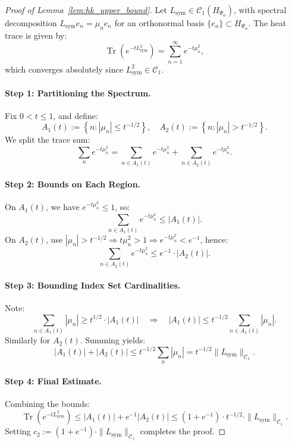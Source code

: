 \begin{proof}[Proof of Lemma~\ref{lem:hk_upper_bound}]
Let \( L_{\mathrm{sym}} \in \mathcal{C}_1(H_{\Psi_\alpha}) \), with spectral decomposition \( L_{\mathrm{sym}} e_n = \mu_n e_n \) for an orthonormal basis \( \{ e_n \} \subset H_{\Psi_\alpha} \). The heat trace is given by:
\[
\operatorname{Tr}(e^{-t L_{\mathrm{sym}}^2}) = \sum_{n=1}^\infty e^{-t \mu_n^2},
\]
which converges absolutely since \( L_{\mathrm{sym}}^2 \in \mathcal{C}_1 \).

\paragraph{Step 1: Partitioning the Spectrum.}
Fix \( 0 < t \le 1 \), and define:
\[
A_1(t) := \left\{ n : |\mu_n| \le t^{-1/2} \right\}, \quad
A_2(t) := \left\{ n : |\mu_n| > t^{-1/2} \right\}.
\]
We split the trace sum:
\[
\sum_n e^{-t \mu_n^2} = \sum_{n \in A_1(t)} e^{-t \mu_n^2} + \sum_{n \in A_2(t)} e^{-t \mu_n^2}.
\]

\paragraph{Step 2: Bounds on Each Region.}
On \( A_1(t) \), we have \( e^{-t \mu_n^2} \le 1 \), so:
\[
\sum_{n \in A_1(t)} e^{-t \mu_n^2} \le |A_1(t)|.
\]
On \( A_2(t) \), use \( |\mu_n| > t^{-1/2} \Rightarrow t \mu_n^2 > 1 \Rightarrow e^{-t \mu_n^2} < e^{-1} \), hence:
\[
\sum_{n \in A_2(t)} e^{-t \mu_n^2} \le e^{-1} \cdot |A_2(t)|.
\]

\paragraph{Step 3: Bounding Index Set Cardinalities.}
Note:
\[
\sum_{n \in A_1(t)} |\mu_n| \ge t^{1/2} \cdot |A_1(t)| \quad \Rightarrow \quad |A_1(t)| \le t^{-1/2} \sum_{n \in A_1(t)} |\mu_n|.
\]
Similarly for \( A_2(t) \). Summing yields:
\[
|A_1(t)| + |A_2(t)| \le t^{-1/2} \sum_n |\mu_n| = t^{-1/2} \|L_{\mathrm{sym}}\|_{\mathcal{C}_1}.
\]

\paragraph{Step 4: Final Estimate.}
Combining the bounds:
\[
\operatorname{Tr}(e^{-t L_{\mathrm{sym}}^2})
\le |A_1(t)| + e^{-1} |A_2(t)|
\le (1 + e^{-1}) \cdot t^{-1/2} \cdot \|L_{\mathrm{sym}}\|_{\mathcal{C}_1}.
\]
Setting \( c_2 := (1 + e^{-1}) \cdot \|L_{\mathrm{sym}}\|_{\mathcal{C}_1} \) completes the proof.
\end{proof}
